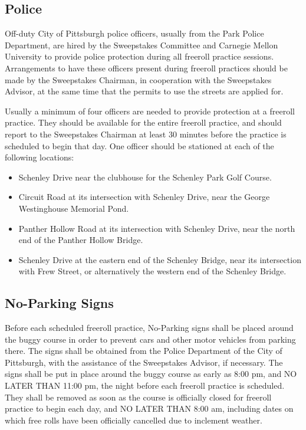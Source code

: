 \subsection{Police}

	Off-duty City of Pittsburgh police officers, usually from the Park Police
	Department, are hired by the Sweepstakes Committee and Carnegie Mellon
	University to provide police protection during all freeroll practice sessions.
	Arrangements to have these officers present during freeroll practices should be
	made by the Sweepstakes Chairman, in cooperation with the Sweepstakes Advisor,
	at the same time that the permits to use the streets are applied for.

	Usually a minimum of four officers are needed to provide protection at a
	freeroll practice. They should be available for the entire freeroll practice,
	and should report to the Sweepstakes Chairman at least 30 minutes before the
	practice is scheduled to begin that day. One officer should be stationed at
	each of the following locations:

	\begin{itemize}

		\item Schenley Drive near the clubhouse for the Schenley Park Golf Course.

		\item Circuit Road at its intersection with Schenley Drive, near the 
		George Westinghouse Memorial Pond.

		\item Panther Hollow Road at its intersection with Schenley Drive,
		near the north end of the Panther Hollow Bridge.

		\item Schenley Drive at the eastern end of the Schenley Bridge, near its 
		intersection with Frew Street, or alternatively the western end of the 
		Schenley Bridge.

	\end{itemize}

\subsection{No-Parking Signs}

	Before each scheduled freeroll practice, No-Parking signs shall be placed
	around the buggy course in order to prevent cars and other motor vehicles from
	parking there. The signs shall be obtained from the Police Department of the
	City of Pittsburgh, with the assistance of the Sweepstakes Advisor, if
	necessary. The signs shall be put in place around the buggy course as early as
	8:00 pm, and NO LATER THAN 11:00 pm, the night before each freeroll practice is
	scheduled. They shall be removed as soon as the course is officially closed for
	freeroll practice to begin each day, and NO LATER THAN 8:00 am, including dates
	on which free rolls have been officially cancelled due to inclement weather.

